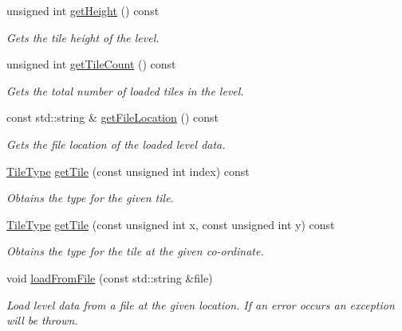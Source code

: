 \begin{DoxyCompactItemize}
unsigned int \hyperlink{classLevelData_aa58248c6dac7cef0b240df372ac09f34}{get\+Height} () const 
\begin{DoxyCompactList}\small\item\em Gets the tile height of the level. \end{DoxyCompactList}\item 
unsigned int \hyperlink{classLevelData_a25eb0194cebc5d67508e3c8dbefadc11}{get\+Tile\+Count} () const 
\begin{DoxyCompactList}\small\item\em Gets the total number of loaded tiles in the level. \end{DoxyCompactList}\item 
const std\+::string \& \hyperlink{classLevelData_a6c1c2be838a5b7e55ce6ff0e804ab09d}{get\+File\+Location} () const 
\begin{DoxyCompactList}\small\item\em Gets the file location of the loaded level data. \end{DoxyCompactList}\item 
\hyperlink{LevelData_8hpp_a47dee72188473c57343127b1a5843398}{Tile\+Type} \hyperlink{classLevelData_a290837e4d45e346b69bc805362a31e69}{get\+Tile} (const unsigned int index) const 
\begin{DoxyCompactList}\small\item\em Obtains the type for the given tile. \end{DoxyCompactList}\item 
\hyperlink{LevelData_8hpp_a47dee72188473c57343127b1a5843398}{Tile\+Type} \hyperlink{classLevelData_a899fadb559d257e0457bbe5778498f03}{get\+Tile} (const unsigned int x, const unsigned int y) const 
\begin{DoxyCompactList}\small\item\em Obtains the type for the tile at the given co-\/ordinate. \end{DoxyCompactList}\item 
void \hyperlink{classLevelData_a1ec79101880076ae4291fcdda279633b}{load\+From\+File} (const std\+::string \&file)
\begin{DoxyCompactList}\small\item\em Load level data from a file at the given location. If an error occurs an exception will be thrown. \end{DoxyCompactList}\end{DoxyCompactItemize}

